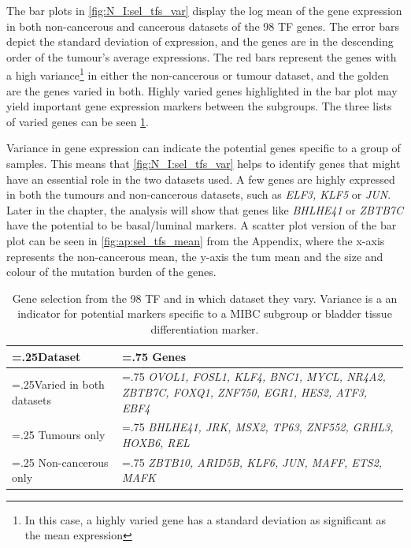 The bar plots in \cref{fig:N_I:sel_tfs_var} display the log mean of the gene expression in both non-cancerous and cancerous datasets of the 98 TF genes. The error bars depict the standard deviation of expression, and the genes are in the descending order of the tumour's average expressions. The red bars represent the genes with a high variance\footnote{In this case, a highly varied gene has a standard deviation as significant as the mean expression} in either the non-cancerous or tumour dataset, and the golden are the genes varied in both. Highly varied genes highlighted in the bar plot may yield important gene expression markers between the subgroups. The three lists of varied genes can be seen \cref{tab:N_I:sel_tfs_var}.


Variance in gene expression can indicate the potential genes specific to a group of samples. This means that \cref{fig:N_I:sel_tfs_var} helps to identify genes that might have an essential role in the two datasets used. A few genes are highly expressed in both the tumours and non-cancerous datasets, such as \textit{ELF3, KLF5} or \textit{JUN}. Later in the chapter, the analysis will show that genes like \textit{BHLHE41} or \textit{ZBTB7C} have the potential to be basal/luminal markers. A scatter plot version of the bar plot can be seen in \cref{fig:ap:sel_tfs_mean} from the Appendix, where the x-axis represents the non-cancerous mean, the y-axis the tum mean and the size and colour of the mutation burden of the genes.


\begin{table}[!t]
  \centering
  \small
  \begin{tabularx}{\textwidth}{>{\hsize=.25\hsize}X|>{\hsize=.75\hsize}X}
    \toprule
    \textbf{Dataset} & \textbf{Genes} \\
    \midrule
    Varied in both datasets & \textit{OVOL1, FOSL1, KLF4, BNC1, MYCL, NR4A2, ZBTB7C, FOXQ1, ZNF750, EGR1, HES2, ATF3, EBF4} \\
    \midrule
    Tumours only & \textit{BHLHE41, JRK, MSX2, TP63, ZNF552, GRHL3, HOXB6, REL} \\
    \midrule
    Non-cancerous only & \textit{ZBTB10, ARID5B, KLF6, JUN, MAFF, ETS2, MAFK} \\
    \bottomrule
  \end{tabularx}
    \caption[Summary of the subset of 98 TF which are highly varied]{Gene selection from the 98 TF and in which dataset they vary. Variance is a an indicator for potential markers specific to a MIBC subgroup or bladder tissue differentiation marker.}
    \label{tab:N_I:sel_tfs_var}
\end{table}



